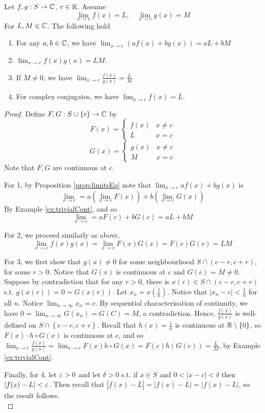 \begin{theorem}
  Let $f,g:S\to\mathbb C$, $c\in\mathbb R$. Assume 
  \[\lim_{x\to c}f(x)=L, \quad \lim_{x\to c}g(x)=M\]
  For $L,M\in\mathbb C$. The following hold
  \begin{enumerate}
    \item For any $a,b\in\mathbb C$, we have $\lim_{x\to c} (af(x)+bg(x))=aL+bM$
    \item $\lim_{x\to c}f(x)g(x) = LM$.
    \item If $M\neq 0$, we have $\lim_{x\to c} \frac{f(x)}{g(x)}= \frac{L}{M}$
    \item For complex conjugates, we have $\lim_{x\to c} \overline{f}(x)= \overline{L}$.
  \end{enumerate}
  \label{thm:elementaryLimits}
\end{theorem}
\begin{proof}
  Define $F,G:S\cup\left\{ c \right\}\to\mathbb C$ by 
  \[ F(x)=
    \begin{cases}
      f(x) & x\neq c \\
      L & x=c
    \end{cases}
  \]
  \[ G(x)=
    \begin{cases}
      g(x) & x\neq c \\
      M & x=c
    \end{cases}
  \]
  Note that $F,G$ are continuous at $c$. 

  For 1, by Proposition \ref{prop:limitsEq} note that $\lim_{x\to c} af(x)+bg(x)$ is 
  \[\lim_{x\to c} = a (\lim_{x\to c} F(x)) + b(\lim_{x\to c} G(x))\]
  By Example \ref{ex:trivialCont}, and so
  \[\lim_{x\to c} = aF(c) + bG(c) = aL + bM\]


  For 2, we proceed similarly as above,
  \[\lim_{x\to c} f(x)g(x) = \lim_{x\to c} F(x)G(x) = F(c)G(c) =LM\]
  
  For 3, we first show that $g(x)\neq 0$ for some neighbourhood $S\cap (c-r,c+r)$, for
  some $r>0$. Notice that $G(x)$ is continuous at $c$ and $G(c)=M\neq 0$. Suppose by
  contradiction that for any $r>0$, there is $x(r)\in S\cap (c-r,c+r)$ s.t.
  $g(x(r))=0=G(x(r))$. Let $x_n=x(\frac{1}{n})$. Notice that
  $|x_n-c|<\frac{1}{n}$ for all $n$. Notice $\lim_{n\to \infty} x_n=c$. By sequential
  characterisation of continuity, we have $0=\lim_{n\to \infty}G(x_n)=G(C)=M$, a
  contradiction. Hence, $\frac{f(x)}{g(x)}$ is well-defined on $S\cap\left\{ c-r,c+r
  \right\}$. Recall that $h(x)=\frac{1}{x}$ is continuous at $\mathbb R\setminus\left\{ 0
  \right\}$, so $F(x)\cdot h\circ G(x)$ is continuous at $c$, and so $\lim_{x\to
  c}\frac{f(x)}{g(x)}= \lim_{x\to c} F(x) h\circ G(x) = F(c) h(G(c)) =
  \frac{L}{M}$, by Example \ref{ex:trivialCont}.

  Finally, for 4, let $\varepsilon>0$ and let $\delta>0$ s.t. if $x\in S$ and $0<|x-c|<\delta$
  then $|f(x)-L|<\varepsilon$. Then recall that $|\overline{f}(x)-\overline{L}| = \overline{|f(x)-L|}=
  |f(x)-L|$, so the result follows.
  \[\]
\end{proof}


